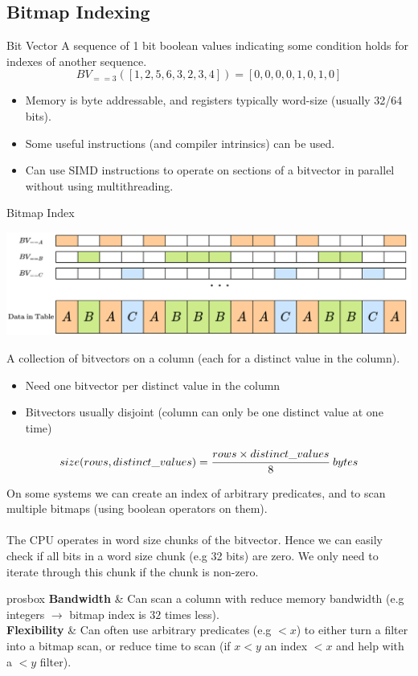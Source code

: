 \subsection{Bitmap Indexing}
\begin{definitionbox}{Bit Vector}
    A sequence of 1 bit boolean values indicating some condition holds for indexes of another sequence.
    \[BV_{==3}([1,2,5,6,3,2,3,4]) = [0,0,0,0,1,0,1,0] \]
    \begin{itemize}
        \item Memory is byte addressable, and registers typically word-size (usually 32/64 bits).
        \item Some useful instructions (and compiler intrinsics) can be used.
        \item Can use SIMD instructions to operate on sections of a bitvector in parallel without using multithreading.
    \end{itemize}
\end{definitionbox}

\begin{definitionbox}{Bitmap Index}
    \begin{center}
        \includegraphics[width=.8\textwidth]{algorithms_and_indices/images/bitmap_index.drawio.png}
    \end{center}
    A collection of bitvectors on a column (each for a distinct value in the column).
    \begin{itemize}
        \item Need one bitvector per distinct value in the column
        \item Bitvectors usually disjoint (column can only be one distinct value at one time)
    \end{itemize}
    \[size(rows, distinct\_values) = \cfrac{rows \times distinct\_values}{8} \ bytes\]
\end{definitionbox}
On some systems we can create an index of arbitrary predicates, and to scan multiple bitmaps (using boolean operators on them).
\\
\\ The CPU operates in word size chunks of the bitvector. Hence we can easily check if all bits in a word size chunk (e.g 32 bits) are zero. We only need to iterate through this chunk if the chunk is non-zero.
\begin{tabbox}{prosbox}
    \textbf{Bandwidth} & Can scan a column with reduce memory bandwidth (e.g integers $\to$ bitmap index is $32$ times less). \\
    \textbf{Flexibility} & Can often use arbitrary predicates (e.g $< x$) to either turn a filter into a bitmap scan, or reduce time to scan (if $x < y$ an index $< x$ and help with a $< y$ filter). \\
\end{tabbox}

